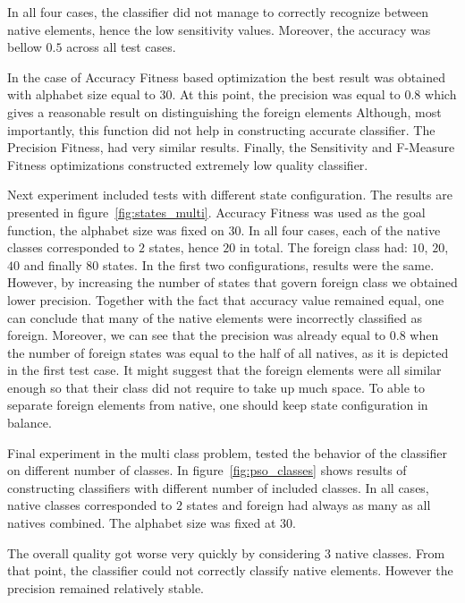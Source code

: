 \documentclass{mini}
\begin{document}
In all four cases, the classifier did not manage to correctly recognize between native elements, hence the low sensitivity values. Moreover, the accuracy was bellow $0.5$ across all test cases. 

In the case of Accuracy Fitness based optimization the best result was obtained with alphabet size equal to $30$. At this point, the precision was equal to $0.8$ which gives a reasonable result on distinguishing the foreign elements Although, most importantly, this function did not help in constructing accurate classifier. The Precision Fitness, had very similar results. Finally, the Sensitivity and F-Measure Fitness optimizations constructed extremely low quality classifier.

\makeFigureFitnessMulti

Next experiment included tests with different state configuration. The results are presented in figure~\ref{fig:states_multi}. Accuracy Fitness was used as the goal function, the alphabet size was fixed on $30$. In all four cases, each of the native classes corresponded to $2$ states, hence $20$ in total. The foreign class had: $10$, $20$, $40$ and finally $80$ states. In the first two configurations, results were the same. However, by increasing the number of states that govern foreign class we obtained lower precision. Together with the fact that accuracy value remained equal, one can conclude that many of the native elements were incorrectly classified as foreign. Moreover, we can see that the precision was already equal to $0.8$ when the number of foreign states was equal to the half of all natives, as it is depicted in the first test case. It might suggest that the foreign elements were all similar enough so that their class did not require to take up much space. To able to separate foreign elements from native, one should keep state configuration in balance.

\makeFigureStateConfigurationMulti

Final experiment in the multi class problem, tested the behavior of the classifier on different number of classes. In figure~\ref{fig:pso_classes} shows results of constructing classifiers with different number of included classes. In all cases, native classes corresponded to $2$ states and foreign had always as many as all natives combined. The alphabet size was fixed at $30$.

The overall quality got worse very quickly by considering $3$ native classes. From that point, the classifier could not correctly classify native elements. However the precision remained relatively stable.
\end{document}
